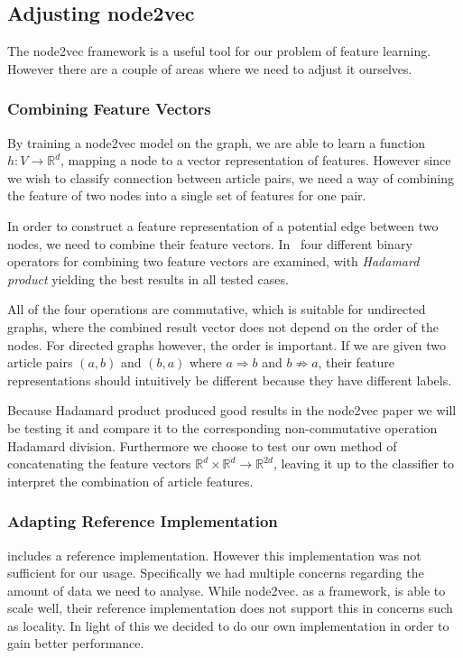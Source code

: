 \subsection{Adjusting node2vec}
The node2vec framework is a useful tool for our problem of feature learning. However there are a couple of areas where we need to adjust it ourselves.

\subsubsection{Combining Feature Vectors}\label{subsub:combining_feature_vectors}
By training a node2vec model on the graph, we are able to learn a function $h:V \to \mathbb{R}^d$, mapping a node to a vector representation of features. However since we wish to classify connection between article pairs, we need a way of combining the feature of two nodes into a single set of features for one pair.

In order to construct a feature representation of a potential edge between two nodes, we need to combine their feature vectors. In~\cite{node2vec} four different binary operators for combining two feature vectors are examined, with \emph{Hadamard product} yielding the best results in all tested cases.

All of the four operations are commutative, which is suitable for undirected graphs, where the combined result vector does not depend on the order of the nodes. For directed graphs however, the order is important. If we are given two article pairs $(a,b)$ and $(b,a)$ where $a \Rightarrow b$ and $b \not \Rightarrow a$, their feature representations should intuitively be different because they have different labels. 

Because Hadamard product produced good results in the node2vec paper we will be testing it and compare it to the corresponding non-commutative operation Hadamard division. Furthermore we choose to test our own method of concatenating the feature vectors $\mathbb{R}^d \times \mathbb{R}^d \to \mathbb{R}^{2d}$, leaving it up to the classifier to interpret the combination of article features.


\subsubsection{Adapting Reference Implementation}
\cite{node2vec} includes a reference implementation. However this implementation was not sufficient for our usage. Specifically we had multiple concerns regarding the amount of data we need to analyse. While node2vec. as a framework, is able to scale well, their reference implementation does not support this in concerns such as locality. In light of this we decided to do our own implementation in order to gain better performance.

